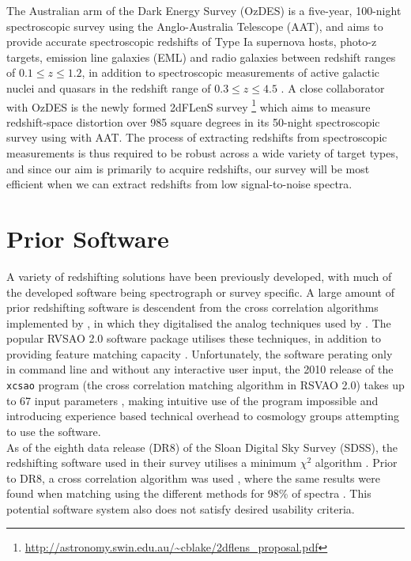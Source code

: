 \documentclass[iop]{emulateapj}
\begin{document}
The Australian arm of the Dark Energy Survey (OzDES) is a five-year, 100-night spectroscopic survey using the Anglo-Australia Telescope (AAT), and aims to provide accurate spectroscopic redshifts of Type Ia supernova hosts, photo-z targets, emission line galaxies (EML) and radio galaxies between redshift ranges of $0.1 \leq  z \leq 1.2$, in addition to spectroscopic measurements of active galactic nuclei and quasars in the redshift range of $0.3 \leq z \leq 4.5$ \cite{fang2015}. A close collaborator with OzDES is the newly formed 2dFLenS survey \footnote{\url{http://astronomy.swin.edu.au/~cblake/2dflens_proposal.pdf}} which aims to measure redshift-space distortion over 985 square degrees in its 50-night spectroscopic survey using with AAT.  The process of extracting redshifts from spectroscopic measurements is thus required to be robust across a wide variety of target types, and since our aim is primarily to acquire redshifts,  our survey will be most efficient when we can extract redshifts from low signal-to-noise spectra.


\section{Prior Software}

A variety of redshifting solutions have been previously developed, with much of the developed software being spectrograph or survey specific. A large amount of prior redshifting software is descendent from the cross correlation algorithms implemented by \citet{tonry1979survey}, in which they digitalised the analog techniques used by \citet{griffin1967photoelectric}. The popular RVSAO 2.0 software package utilises these techniques, in addition to providing feature matching capacity \citep{kurtz1998rvsao}. Unfortunately, the software perating only in command line and without any interactive user input, the 2010 release of the \verb+xcsao+ program (the cross correlation matching algorithm in RSVAO 2.0) takes up to 67 input parameters \citep{parameters}, making intuitive use of the program impossible and introducing experience based technical overhead to cosmology groups attempting to use the software.\\

As of the eighth data release (DR8) of the Sloan Digital Sky Survey (SDSS), the redshifting software used in their survey utilises a minimum $\chi^2$ algorithm \citep{aihara2011eighth}. Prior to DR8, a cross correlation algorithm was used  \citep{sdss6}, where the same results were found when matching using the different methods for 98\% of spectra \cite{aihara2011eighth}. This potential software system also does not satisfy desired usability criteria.\\
\end{document}
